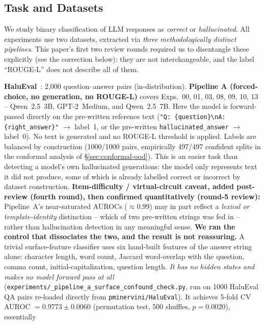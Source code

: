 \documentclass[10pt,twocolumn]{article}
\begin{document}
\subsection{Task and Datasets}
\label{sec:setup-task}

We study binary classification of LLM responses as \emph{correct} or
\emph{hallucinated}. All experiments use two datasets, extracted via
\emph{three methodologically distinct pipelines}. This paper's first two
review rounds required us to disentangle these explicitly (see the
correction below): they are not interchangeable, and the label
``ROUGE-L'' does not describe all of them.

\noindent\textbf{HaluEval}~\citep{li2023halueval}: 2{,}000 question--answer
pairs (in-distribution). \textbf{Pipeline A (forced-choice, no
generation, no ROUGE-L)} covers Exps.~00, 01, 03, 08, 09, 10, 13 --
Qwen~2.5~3B, GPT-2~Medium, and Qwen~2.5~7B. Here the model is
forward-passed directly on the pre-written reference text
(\texttt{"Q: \{question\}\textbackslash nA: \{right\_answer\}"} $\to$
label~1, or the pre-written \texttt{hallucinated\_answer} $\to$
label~0). No text is generated and no ROUGE-L threshold is applied.
Labels are balanced by construction (1000/1000 pairs, empirically
497/497 confident splits in the conformal analysis of
\S\ref{sec:conformal-ood}). This is an easier task than detecting a
model's own hallucinated generations: the model only represents text it
did not produce, some of which is already labelled correct or incorrect
by dataset construction. \textbf{Item-difficulty / virtual-circuit
caveat, added post-review (fourth round), then confirmed quantitatively
(round-5 review):} Pipeline~A's near-saturated AUROCs ($\approx 0.99$)
may in part reflect a \emph{lexical or template-identity} distinction --
which of two pre-written strings was fed in -- rather than hallucination
detection in any meaningful sense. \textbf{We ran the control that
dissociates the two, and the result is not reassuring.} A trivial
surface-feature classifier uses six hand-built features of the answer
string alone: character length, word count, Jaccard word-overlap with
the question, comma count, initial-capitalization, question length.
\emph{It has no hidden states and makes no model forward pass at all}
(\texttt{experiments/\_\allowbreak pipeline\_\allowbreak a\_\allowbreak surface\_\allowbreak confound\_\allowbreak check.py}, run
on 1000 HaluEval QA pairs re-loaded directly from
\texttt{pminervini/HaluEval}). It achieves 5-fold CV AUROC $=0.9773 \pm
0.0060$ (permutation test, 500 shuffles, $p=0.0020$), essentially
\end{document}
